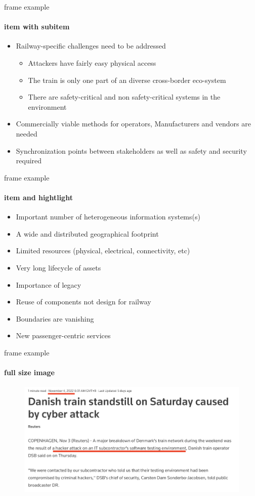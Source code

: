 
\begin{frame}{frame example}
	\framesubtitle{item with subitem}
		\begin{itemize}
			\item Railway-specific challenges need to be addressed
				\begin{itemize}
					\item  Attackers have fairly easy physical access
					\item The train is only one part of an diverse cross-border eco-system
					\item There are safety-critical and non safety-critical systems in the environment
				\end{itemize}
			\item Commercially viable methods for operators, Manufacturers and vendors are needed
			\item Synchronization points between stakeholders as well as safety and security required
		\end{itemize}		
			
\end{frame}
\begin{frame}{frame example}
	\framesubtitle{item and hightlight}
		\begin{itemize}
			\item Important number of \alert{heterogeneous information systems(s)}
			\item A \alert{wide and distributed} geographical footprint
			\item Limited resources (physical, electrical, connectivity, etc)
			\item Very \alert{long lifecycle} of assets
			\item Importance of legacy
			\item \alert{Reuse of components} not design for railway
			\item \alert{Boundaries} are vanishing
			\item New \alert{passenger-centric} services
		\end{itemize}		
			
\end{frame}
\begin{frame}{frame example}
	\framesubtitle{full size image}
		\begin{figure}[hbt]
  \includegraphics[width=.9\textwidth]{gfx/news.jpeg}
\end{figure}
	
			
\end{frame}
